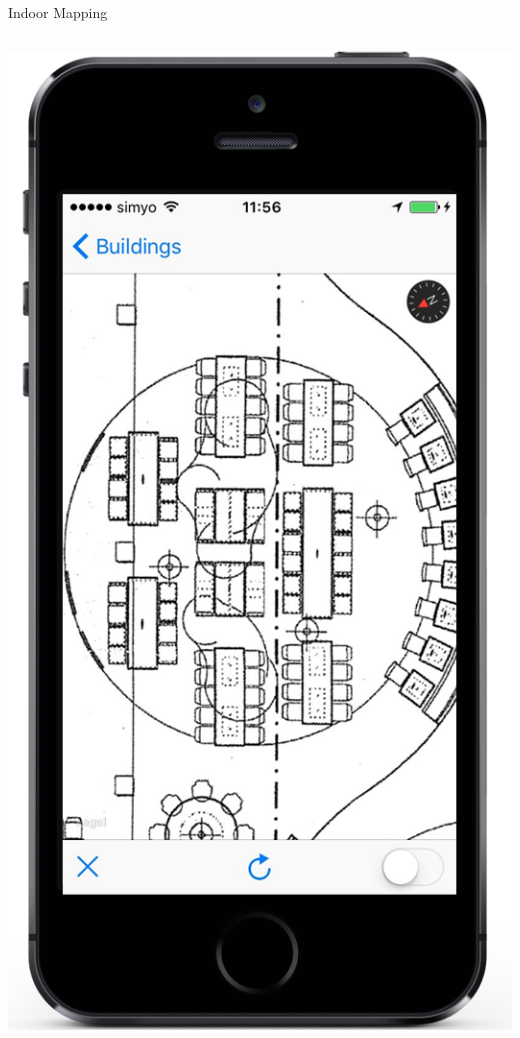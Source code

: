\documentclass[11pt]{beamer}
\begin{document}
\begin{frame}{Indoor Mapping}
\begin{columns}[T]
\begin{column}{.4\textwidth}
  \includegraphics[scale=0.25]{mapzoomlevel}
  \end{column}
\end{columns}

\end{frame}
\end{document}
